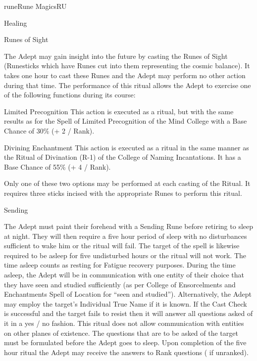 \begin{college}[1.1]{rune}{Rune Magics}{RU}
\begin{ritual}[Q-4]{Healing}
\begin{effects}
\end{effects}
\end{ritual}

\begin{ritual}[Q-5]{Runes of Sight}
\begin{effects}
The Adept may gain insight into the future by casting the Runes of
Sight (Runesticks which have Runes cut into them representing the
cosmic balance). It takes one hour to cast these Runes and the Adept
may perform no other action during that time.  The performance of this
ritual allows the Adept to exercise one of the following functions
during its course:

\begin{Description}
\item[Limited Precognition]
This action is executed as a ritual, but with the same results as for
the Spell of Limited Precognition of the Mind College with a Base
Chance of 30\% (+ 2 / Rank).

\item[Divining Enchantment]
This action is executed as a ritual in the same manner as the Ritual
of Divination (R-1) of the College of Naming Incantations. It has a
Base Chance of 55\% (+ 4 / Rank).
\end{Description}

Only one of these two options may be performed at each casting of the
Ritual. It requires three sticks incised with the appropriate Runes to
perform this ritual.
\end{effects}
\end{ritual}

\begin{ritual}[Q-6]{Sending}
\begin{effects}
The Adept must paint their forehead with a Sending Rune before
retiring to sleep at night.  They will then require a five hour period
of sleep with no disturbances sufficient to wake him or the ritual
will fail.  The target of the spell is likewise required to be asleep
for five undisturbed hours or the ritual will not work.  The time
asleep counts as resting for Fatigue recovery purposes.  During the
time asleep, the Adept will be in communication with one entity of
their choice that they have seen and studied sufficiently (as per
College of Ensorcelments and Enchantments Spell of Location for ``seen
and studied'').  Alternatively, the Adept may employ the target's
Individual True Name if it is known.  If the Cast Check is successful
and the target fails to resist then it will answer all questions asked
of it in a yes / no fashion. This ritual does not allow communication
with entities on other planes of existence. The questions that are to
be asked of the target must be formulated before the Adept goes to
sleep.  Upon completion of the five hour ritual the Adept may receive
the answers to Rank  questions ( if unranked).
\end{effects}
\end{ritual}


\end{college}
